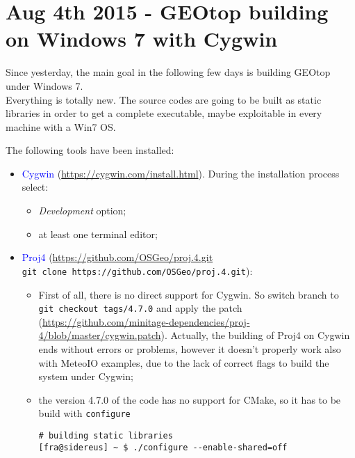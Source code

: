 \section{Aug 4th 2015 - GEOtop building on Windows 7 with Cygwin}\label{sec:20150804}

Since yesterday, the main goal in the following few days is building GEOtop under Windows 7.\\

\noindent Everything is totally new. The source codes are going to be built as static libraries in order to get a complete executable, maybe exploitable in every machine with a Win7 OS.\par\medskip

\noindent The following tools have been installed:

\begin{itemize}
\item \textcolor{blue}{Cygwin} (\url{https://cygwin.com/install.html}). During the installation process select:
  \begin{itemize}
  \item \textit{Development} option;
  \item at least one terminal editor;
  \end{itemize}
\item \textcolor{blue}{Proj4} (\url{https://github.com/OSGeo/proj.4.git}\\\lstinline!git clone https://github.com/OSGeo/proj.4.git!):
  \begin{itemize}
  \item First of all, there is no direct support for Cygwin. So switch branch to \lstinline!git checkout tags/4.7.0! and apply the patch (\url{https://github.com/minitage-dependencies/proj-4/blob/master/cygwin.patch}). Actually, the building of Proj4 on Cygwin ends without errors or problems, however it doesn't properly work also with MeteoIO examples, due to the lack of correct flags to build the system under Cygwin;
  \item the version 4.7.0 of the code has no support for CMake, so it has to be build with \lstinline!configure!
    \begin{lstlisting}[style=bashStyle]
# building static libraries
[fra@sidereus] ~ $ ./configure --enable-shared=off

\end{lstlisting}
\end{itemize}
\end{itemize}

